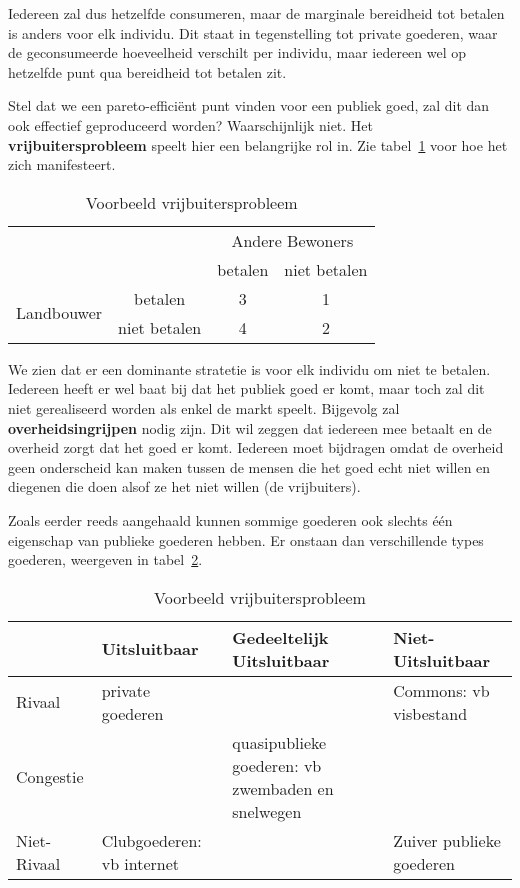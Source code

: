 Iedereen zal dus hetzelfde consumeren, maar de marginale bereidheid tot betalen is anders voor elk individu. Dit staat in tegenstelling tot private goederen, waar de geconsumeerde hoeveelheid verschilt per individu, maar iedereen wel op hetzelfde punt qua bereidheid tot betalen zit.

Stel dat we een pareto-effici\"ent punt vinden voor een publiek goed, zal dit dan ook effectief geproduceerd worden? Waarschijnlijk niet. Het \textbf{vrijbuitersprobleem} speelt hier een belangrijke rol in. Zie tabel~\ref{tab:vrijbuitersprobleem} voor hoe het zich manifesteert.

\begin{table}
   \centering
   \begin{tabular}[htbp]{cccc}
       & &  \multicolumn{2}{c}{Andere Bewoners} \\
       & & betalen & niet betalen \\
      \multirow{2}{*}{Landbouwer} & betalen & 3 & 1 \\
       & niet betalen & 4 & 2 \\
   \end{tabular}
   \caption{Voorbeeld vrijbuitersprobleem}
   \label{tab:vrijbuitersprobleem}
\end{table}
We zien dat er een dominante stratetie is voor elk individu om niet te betalen. Iedereen heeft er wel baat bij dat het publiek goed er komt, maar toch zal dit niet gerealiseerd worden als enkel de markt speelt. Bijgevolg zal \textbf{overheidsingrijpen} nodig zijn. Dit wil zeggen dat iedereen mee betaalt en de overheid zorgt dat het goed er komt. Iedereen moet bijdragen omdat de overheid geen onderscheid kan maken tussen de mensen die het goed echt niet willen en diegenen die doen alsof ze het niet willen (de vrijbuiters).

Zoals eerder reeds aangehaald kunnen sommige goederen ook slechts \'e\'en eigenschap van publieke goederen hebben. Er onstaan dan verschillende types goederen, weergeven in tabel~\ref{tab:overzichteigenschappenpg}.
\begin{table}[h]
   \centering
   \begin{tabular}[htbp]{|l|p{3cm} p{3cm} p{3cm}|}
      \hline
       & Uitsluitbaar & Gedeeltelijk Uitsluitbaar & Niet-Uitsluitbaar \\
       \hline
      Rivaal & private goederen & & Commons: vb visbestand \\
      Congestie & & quasipublieke goederen: vb zwembaden en snelwegen & \\
      Niet-Rivaal & Clubgoederen: vb internet &  & Zuiver publieke goederen \\
      \hline
   \end{tabular}
   \caption{Voorbeeld vrijbuitersprobleem}
   \label{tab:overzichteigenschappenpg}
\end{table}

